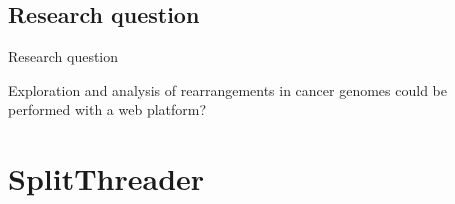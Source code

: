\documentclass[10pt]{beamer}
\newcommand{\1}{
        	\setbeamertemplate{background}{
        		\texttt{[image: img/1\_BIO]}
        		\tikz[overlay] \fill[fill opacity=0.75,fill=white] (0,0) rectangle (-\paperwidth,\paperheight);
        	}
}
\begin{document}
\subsection{Research question}

\begin{frame}{Research question}{}	
	\begin{block}{}
		Exploration and analysis of rearrangements in cancer genomes could be performed with a web platform?
	\end{block}	
\end{frame}


\section{SplitThreader}

\end{document}
